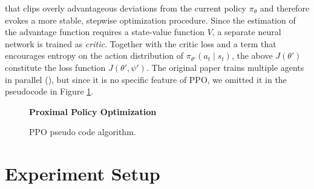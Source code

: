 \documentclass[a4paper, 11pt]{article}
\begin{document}
	that clips overly advantageous deviations from the current policy $\pi_{\theta}$ and therefore evokes a more stable, stepwise optimization procedure. Since the estimation of the advantage function requires a state-value function $V$, a separate neural network is trained as \textit{critic}. Together with the critic loss and a term that encourages entropy on the action distribution of $\pi_{\theta'}(a_t\mid s_t)$, the above $J(\theta')$ constitute the loss function $J(\theta',\psi')$. The original paper trains multiple agents in parallel (\cite{schulman2017proximal}), but since it is no specific feature of PPO, we omitted it in the pseudocode in Figure \ref{fig:ppo}.
	\begin{figure}[H]
		\begin{algorithm}[H]
			\caption{\textbf{Proximal Policy Optimization}}
			\small %
			\raggedright
			\renewcommand{\algorithmicrequire}{\textbf{Initialize:}} %
			\begin{algorithmic}[1]
				\ENDFOR
				\ENDFOR
				\ENDWHILE
			\end{algorithmic}
		\end{algorithm}
		\caption{PPO pseudo code algorithm.}
		\label{fig:ppo}
	\end{figure}
	\section{Experiment Setup}
\end{document}
